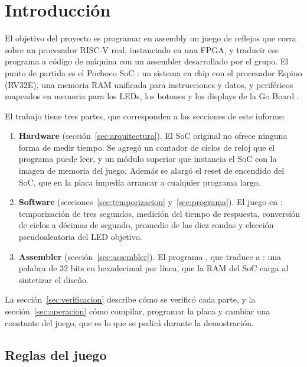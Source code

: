\section{Introducción}

El objetivo del proyecto es programar en assembly un juego de reflejos que corra sobre
un procesador RISC-V real, instanciado en una FPGA, y traducir ese programa a código de
máquina con un assembler desarrollado por el grupo. El punto de partida es el Pochoco
SoC \cite{pochoco}: un sistema en chip con el procesador Espino (RV32E), una memoria RAM
unificada para instrucciones y datos, y periféricos mapeados en memoria para los LEDs,
los botones y los displays de la Go Board \cite{goboard}.

El trabajo tiene tres partes, que corresponden a las secciones de este informe:

\begin{enumerate}
  \item \textbf{Hardware} (sección~\ref{sec:arquitectura}). El SoC original no ofrece
        ninguna forma de medir tiempo. Se agregó un contador de ciclos de reloj que el
        programa puede leer, y un módulo superior  que instancia el SoC
        con la imagen de memoria del juego. Además se alargó el reset de encendido del
        SoC, que en la placa impedía arrancar a cualquier programa largo.
  \item \textbf{Software} (secciones~\ref{sec:temporizacion} y~\ref{sec:programa}). El
        juego en : temporización de tres segundos, medición del tiempo
        de respuesta, conversión de ciclos a décimas de segundo, promedio de las diez
        rondas y elección pseudoaleatoria del LED objetivo.
  \item \textbf{Assembler} (sección~\ref{sec:assembler}). El programa
        , que traduce  a : una palabra
        de 32 bits en hexadecimal por línea, que la RAM del SoC carga al sintetizar el
        diseño.
\end{enumerate}

La sección~\ref{sec:verificacion} describe cómo se verificó cada parte, y la
sección~\ref{sec:operacion} cómo compilar, programar la placa y cambiar una constante
del juego, que es lo que se pedirá durante la demostración.

\subsection{Reglas del juego}
\label{sec:reglas}

